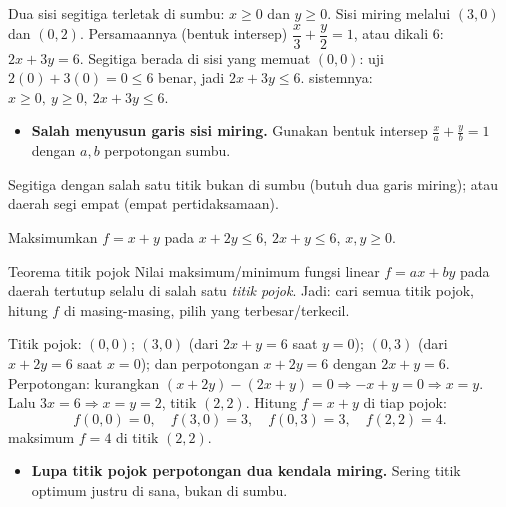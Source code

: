 \jawab
{} Dua sisi segitiga terletak di sumbu: $x\ge0$ dan $y\ge0$.
 Sisi miring melalui $(3,0)$ dan $(0,2)$. Persamaannya (bentuk
intersep) $\dfrac x3+\dfrac y2=1$, atau dikali $6$: $2x+3y=6$.
 Segitiga berada di sisi yang memuat $(0,0)$: uji $2(0)+3(0)=0\le6$
benar, jadi $2x+3y\le6$.
\jadi sistemnya: $\boxed{x\ge0,\ y\ge0,\ 2x+3y\le6}$.

\begin{jebakan}
\begin{itemize}[leftmargin=*,topsep=2pt]
  \item \textbf{Salah menyusun garis sisi miring.} Gunakan bentuk intersep
  $\frac{x}{a}+\frac{y}{b}=1$ dengan $a,b$ perpotongan sumbu.
\end{itemize}
\end{jebakan}

\begin{variasi}
Segitiga dengan salah satu titik bukan di sumbu (butuh dua garis miring); atau
daerah segi empat (empat pertidaksamaan).
\end{variasi}

\begin{soalbox}{}
Maksimumkan $f=x+y$ pada $x+2y\le6$, $2x+y\le6$, $x,y\ge0$.
\end{soalbox}

\begin{ingat}{Teorema titik pojok}
Nilai maksimum/minimum fungsi linear $f=ax+by$ pada daerah tertutup selalu di
salah satu \emph{titik pojok}. Jadi: cari semua titik pojok, hitung $f$ di
masing-masing, pilih yang terbesar/terkecil.
\end{ingat}

\jawab
{} Titik pojok: $(0,0)$; $(3,0)$ (dari $2x+y=6$ saat $y=0$); $(0,3)$
(dari $x+2y=6$ saat $x=0$); dan perpotongan $x+2y=6$ dengan $2x+y=6$.
 Perpotongan: kurangkan $(x+2y)-(2x+y)=0\Rightarrow -x+y=0\Rightarrow
x=y$. Lalu $3x=6\Rightarrow x=y=2$, titik $(2,2)$.
 Hitung $f=x+y$ di tiap pojok:
\[
f(0,0)=0,\quad f(3,0)=3,\quad f(0,3)=3,\quad f(2,2)=4.
\]
\jadi maksimum $f=4$ di titik $(2,2)$.

\begin{jebakan}
\begin{itemize}[leftmargin=*,topsep=2pt]
  \item \textbf{Lupa titik pojok perpotongan dua kendala miring.} Sering titik
  optimum justru di sana, bukan di sumbu.
\end{itemize}
\end{jebakan}

